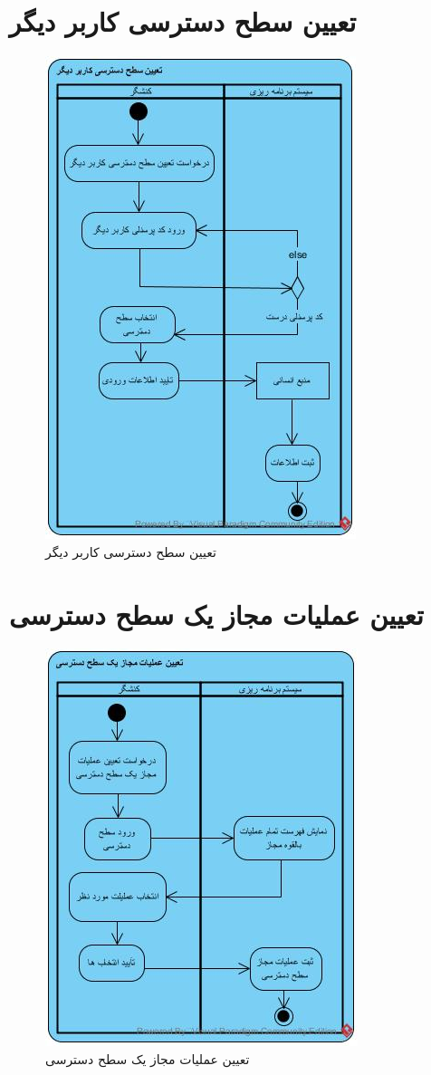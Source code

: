 \section{تعیین سطح دسترسی کاربر دیگر}
\begin{figure}[H]
	\centering
	\includegraphics[scale=0.9]{img/activity/SetUserAccessLevel}
	\caption{تعیین سطح دسترسی کاربر دیگر}
\end{figure}


\section{تعیین عملیات مجاز یک سطح دسترسی}
\begin{figure}[H]
	\centering
	\includegraphics[scale=1]{img/activity/SetPermissions}
	\caption{تعیین عملیات مجاز یک سطح دسترسی}
\end{figure}



